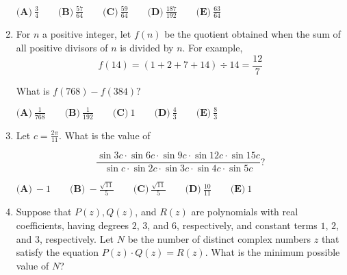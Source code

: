\documentclass{article}
\begin{document}
\begin{enumerate}[label=\arabic*., itemsep=0.5em]
$\textbf{(A)}\: \frac34\qquad\textbf{(B)} \: \frac{57}{64}\qquad\textbf{(C)} \: \frac{59}{64}\qquad\textbf{(D)} \: \frac{187}{192}\qquad\textbf{(E)} \: \frac{63}{64}$\par \vspace{0.5em}\item For $n$ a positive integer, let $f(n)$ be the quotient obtained when the sum of all positive divisors of $n$ is divided by $n.$ For example, 
\begin{equation*}
f(14)=(1+2+7+14)\div 14=\frac{12}{7}
\end{equation*}

What is $f(768)-f(384)?$

$\textbf{(A)}\ \frac{1}{768} \qquad\textbf{(B)}\ \frac{1}{192} \qquad\textbf{(C)}\ 1 \qquad\textbf{(D)}\
\frac{4}{3} \qquad\textbf{(E)}\ \frac{8}{3}$\par \vspace{0.5em}\item Let $c = \frac{2\pi}{11}.$ What is the value of

\begin{equation*}
\frac{\sin 3c \cdot \sin 6c \cdot \sin 9c \cdot \sin 12c \cdot \sin 15c}{\sin c \cdot \sin 2c \cdot \sin 3c \cdot \sin 4c \cdot \sin 5c}?
\end{equation*}


$\textbf{(A)}\ {-}1 \qquad\textbf{(B)}\ {-}\frac{\sqrt{11}}{5} \qquad\textbf{(C)}\ \frac{\sqrt{11}}{5} \qquad\textbf{(D)}\
\frac{10}{11} \qquad\textbf{(E)}\ 1$\par \vspace{0.5em}\item Suppose that $P(z), Q(z)$, and $R(z)$ are polynomials with real coefficients, having degrees $2$, $3$, and $6$, respectively, and constant terms $1$, $2$, and $3$, respectively. Let $N$ be the number of distinct complex numbers $z$ that satisfy the equation $P(z) \cdot Q(z)=R(z)$. What is the minimum possible value of $N$?


\end{enumerate}
\end{document}
